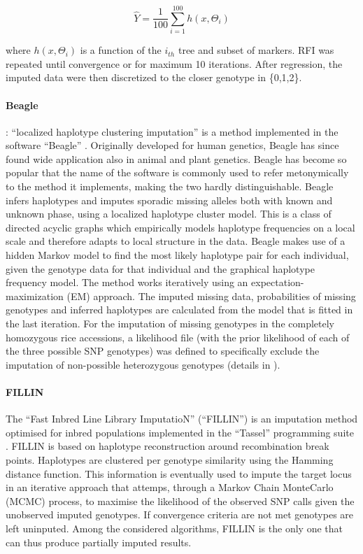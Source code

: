 \begin{equation}
\label{eq:RFI_regression}
\hat{Y} = \frac{1}{100}\sum_{i=1}^{100} h(x,\Theta_i)
\end{equation}

where $h(x,\Theta_i)$ is a function of the $i_{th}$ tree and subset of markers. RFI was repeated until convergence or for maximum 10 iterations. After regression, the imputed data were then discretized to the closer genotype in \{0,1,2\}. 

\paragraph{Beagle}
\label{par:Beagle}
: ``localized haplotype clustering imputation'' is a method implemented in the software ``Beagle'' \cite{browning_rapid_2007}. Originally developed for human genetics, Beagle has since found wide application also in animal and plant genetics. Beagle has become so popular that the name of the software is commonly used to refer metonymically to the method it implements, making the two hardly distinguishable. Beagle infers haplotypes and imputes sporadic missing alleles both with known and unknown phase, using a localized haplotype cluster model. This is a class of directed acyclic graphs which empirically models haplotype frequencies on a local scale and therefore adapts to local structure in the data. Beagle makes use of a hidden Markov model to find the most likely haplotype pair for each individual, given the genotype data for that individual and the graphical haplotype frequency model. The method works iteratively using an expectation-maximization (EM) approach. The imputed missing data, probabilities of missing genotypes and inferred haplotypes are calculated from the model that is fitted in the last iteration. For the imputation of missing genotypes in the completely homozygous rice accessions, a likelihood file (with the prior likelihood of each of the three possible SNP genotypes) was defined to specifically exclude the imputation of non-possible heterozygous genotypes (details in \cite{beagle3_manual}).

\paragraph{FILLIN}
The ``Fast Inbred Line Library ImputatioN'' (``FILLIN'') is an imputation method optimised for inbred populations implemented in the ``Tassel'' programming suite \cite{swarts_novel_2014}. FILLIN is based on haplotype reconstruction around recombination break points. Haplotypes are clustered per genotype similarity using the Hamming distance function. This information is eventually used to impute the target locus in an iterative approach that attemps, through a Markov Chain MonteCarlo (MCMC) process, to maximise the likelihood of the observed SNP calls given the unobserved imputed genotypes. If convergence criteria are not met genotypes are left uninputed. Among the considered algorithms, FILLIN is the only one that can thus produce partially imputed results.

